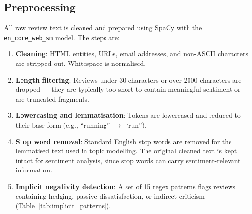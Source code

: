 \subsection{Preprocessing}
\begin{justify}
All raw review text is cleaned and prepared using SpaCy \cite{spacy2} with the \texttt{en\_core\_web\_sm} model. The steps are:

\begin{enumerate}
    \item \textbf{Cleaning}: HTML entities, URLs, email addresses, and non-ASCII characters are stripped out. Whitespace is normalised.
    \item \textbf{Length filtering}: Reviews under 30 characters or over 2000 characters are dropped — they are typically too short to contain meaningful sentiment or are truncated fragments.
    \item \textbf{Lowercasing and lemmatisation}: Tokens are lowercased and reduced to their base form (e.g., ``running'' $\rightarrow$ ``run'').
    \item \textbf{Stop word removal}: Standard English stop words are removed for the lemmatised text used in topic modelling. The original cleaned text is kept intact for sentiment analysis, since stop words can carry sentiment-relevant information.
    \item \textbf{Implicit negativity detection}: A set of 15 regex patterns flags reviews containing hedging, passive dissatisfaction, or indirect criticism (Table~\ref{tab:implicit_patterns}).
\end{enumerate}


\end{justify}
